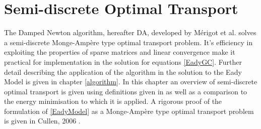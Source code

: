 \chapter{Semi-discrete Optimal Transport \label{OptimalTransport}}
The Damped Newton algorithm, hereafter DA, developed by M\'{e}rigot et al. \cite{Merigot2017} solves a semi-discrete Monge-Amp\`{e}re type optimal transport problem. It's efficiency in exploiting the properties of sparse matrices and linear convergence \cite{Merigot2017} make it practical for implementation in the solution for equations \ref{EadyGC}. Further detail describing the application of the algorithm in the solution to the Eady Model is given in chapter \ref{algorithm}. In this chapter an overview of semi-discrete optimal transport is given using definitions given in \cite{Kitagawa2016, Merigot2017} as well as a comparison to the energy minimisation to which it is applied. A rigorous proof of the formulation of \ref{EadyModel} as a Monge-Amp\`{e}re type optimal transport problem is given in Cullen, 2006 \cite{Cullen2006a}.
